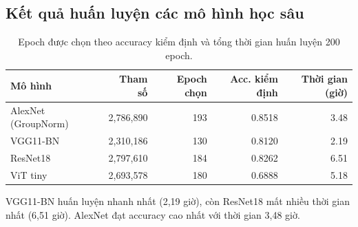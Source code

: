 \subsection{Kết quả huấn luyện các mô hình học sâu}
\begin{table}[H]
\centering
\small
\caption{Epoch được chọn theo accuracy kiểm định và tổng thời gian huấn luyện 200 epoch.}
\label{tab:deep-training}
\begin{tabular}{lrrrr}
\toprule
Mô hình & Tham số & Epoch chọn & Acc. kiểm định & Thời gian (giờ) \\
\midrule
AlexNet (GroupNorm) & 2,786,890 & 193 & 0.8518 & 3.48 \\
VGG11-BN & 2,310,186 & 130 & 0.8120 & 2.19 \\
ResNet18 & 2,797,610 & 184 & 0.8262 & 6.51 \\
ViT tiny & 2,693,578 & 180 & 0.6888 & 5.18 \\
\bottomrule
\end{tabular}
\end{table}

VGG11-BN huấn luyện nhanh nhất (2,19 giờ), còn ResNet18 mất nhiều thời gian nhất (6,51 giờ). AlexNet đạt accuracy cao nhất với thời gian 3,48 giờ.
